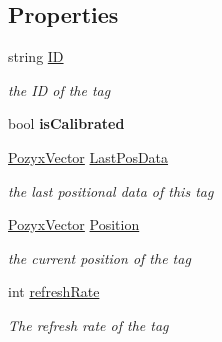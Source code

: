 \subsection*{Properties}
\begin{DoxyCompactItemize}
\item 
string \hyperlink{class_pozyx_positioner_1_1_framework_1_1_tag_a0d75eeca4dea7088e2b4a60230c13012}{ID}
\begin{DoxyCompactList}\small\item\em the ID of the tag \end{DoxyCompactList}\item 
\mbox{\label{class_pozyx_positioner_1_1_framework_1_1_tag_a02cdde9c3303a18f28453056939bf045}} 
bool {\bfseries is\+Calibrated}
\item 
\hyperlink{struct_pozyx_positioner_1_1_framework_1_1_pozyx_vector}{Pozyx\+Vector} \hyperlink{class_pozyx_positioner_1_1_framework_1_1_tag_ac60d7ebc6171c464cd77e81aae36cacc}{Last\+Pos\+Data}
\begin{DoxyCompactList}\small\item\em the last positional data of this tag \end{DoxyCompactList}\item 
\hyperlink{struct_pozyx_positioner_1_1_framework_1_1_pozyx_vector}{Pozyx\+Vector} \hyperlink{class_pozyx_positioner_1_1_framework_1_1_tag_a0b1b836b4e64ae70171587a2bcde4d71}{Position}
\begin{DoxyCompactList}\small\item\em the current position of the tag \end{DoxyCompactList}\item 
int \hyperlink{class_pozyx_positioner_1_1_framework_1_1_tag_a9010e57016df0a932c5ce8f8584ff5f9}{refresh\+Rate}
\begin{DoxyCompactList}\small\item\em The refresh rate of the tag \end{DoxyCompactList}\end{DoxyCompactItemize}
